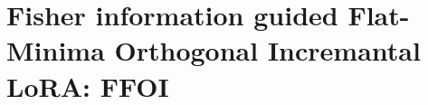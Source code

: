 \documentclass[letterpaper]{article} %
\begin{document}







\section{Fisher information guided Flat-Minima Orthogonal Incremantal LoRA: FFOI}
\label{sec:flatness-lora-method}
\end{document}
